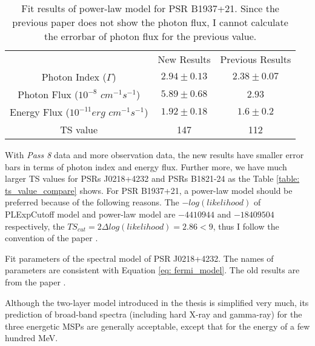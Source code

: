 \documentclass[12pt]{report}
\newcommand{\mycaption}[1]{\protect \caption{#1}}
\begin{document}
      \begin{table}[!ht]
        \centering 
        \begin{tabular}{|ccc|}
          \hline 
          & New Results & Previous Results \\ 
          Photon Index ($\Gamma$) &  $2.94\pm0.13$ & $2.38\pm0.07$ \\
          Photon Flux ($10^{-8}$ $cm^{-1} s^{-1}$) & $5.89\pm0.68$ & $2.93$ \\
          Energy Flux ($10^{-11}erg$ $cm^{-1} s^{-1}$) & $1.92\pm0.18$ & $ 1.6\pm0.2$ \\ 
          TS value & 147 & 112 \\
          \hline 
        \end{tabular}
        \caption{Fit results of power-law model for PSR B1937+21. Since the previous paper 
          does not show the photon flux, I cannot calculate the errorbar of photon flux for 
          the previous value.}
        \label{table: final_results_j1939_pl}
      \end{table}

      With \textit{Pass 8} data and more observation data, the new results have smaller error bars
      in terms of photon index and energy flux. Further more, we have much larger TS values for 
      PSRs J0218+4232 and PSRs B1821-24 as the Table \ref{table: ts_value_compare} shows.
      For PSR B1937+21, a power-law model should be preferred because of the following reasons. 
      The $-log(likelihood)$ of PLExpCutoff model and power-law model are $-4410944$ and 
      $-18409504$ respectively, the $TS_{cut} = 2\Delta log(likelihood) = 2.86 < 9$,  thus I 
      follow the convention of the paper \cite{2013ApJS..208...17A}. 

      \begin{table}[!ht]
        \centering
          \mycaption{Fit parameters of the spectral model of PSR J0218+4232. 
            The names of parameters are consistent with Equation
            \ref{eq: fermi_model}. The old results are from the paper \cite{0067-0049-208-2-17}.}
          \label{table: ts_value_compare}        
      \end{table}  
    
      Although the two-layer model introduced in the thesis is simplified very much, its prediction
      of broad-band spectra (including hard X-ray and gamma-ray) for the three energetic MSPs are 
      generally acceptable, except that for the energy of a few hundred MeV.






          
\end{document}

